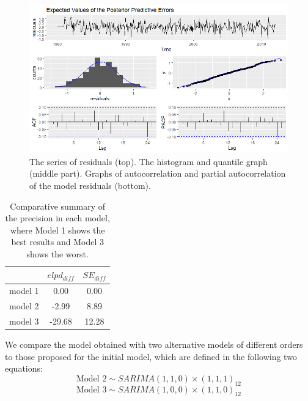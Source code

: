 %
\begin{figure}[!ht]
	\centering
	\includegraphics[scale=0.6]{Figs/66}
	\caption{The series of residuals (top). The histogram and quantile graph (middle part). Graphs of autocorrelation and partial autocorrelation of the model residuals (bottom).}
	\label{fig:resi}
\end{figure}
%
\begin{table}[!ht]\centering
	\begin{tabular}{lcc}
		\hline
		& $elpd_{diff}$ & $SE_{diff}$ \\ 
		\hline
		model 1 & 0.00 & 0.00 \\ 
		model 2 & -2.99 & 8.89 \\ 
		model 3 & -29.68 & 12.28 \\ 
		\hline
	\end{tabular}\smallskip 
	\caption{Comparative summary of the precision in each model, where Model 1 shows the best results and Model 3 shows the worst.}\label{tab:loo}
\end{table}
We compare the model obtained with two alternative models of different orders to those proposed for the initial model, which are defined in the following two equations:
%
$$\text{Model 2}\sim SARIMA(1,1,0)\times(1,1,1)_{12}$$
$$\text{Model 3}\sim SARIMA(1,0,0)\times(1,1,0)_{12}$$ 
